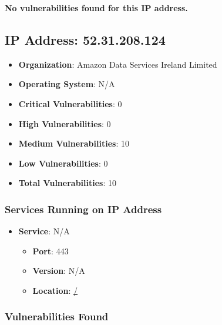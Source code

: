 \documentclass{article}
\begin{document}
\textbf{No vulnerabilities found for this IP address.}




\clearpage



\subsection*{IP Address: 52.31.208.124}

\begin{itemize}
    \item \textbf{Organization}: Amazon Data Services Ireland Limited
    \item \textbf{Operating System}:  N/A 
    \item \textbf{Critical Vulnerabilities}: 0
    \item \textbf{High Vulnerabilities}: 0
    \item \textbf{Medium Vulnerabilities}: 10
    \item \textbf{Low Vulnerabilities}: 0
    \item \textbf{Total Vulnerabilities}: 10
\end{itemize}

\subsubsection*{Services Running on IP Address}

\begin{itemize}
    
        \item \textbf{Service}: N/A
        \begin{itemize}
            \item \textbf{Port}: 443
            \item \textbf{Version}:  N/A 
            \item \textbf{Location}: \href{ / }{ / }
        \end{itemize}
    
\end{itemize}


\subsubsection*{Vulnerabilities Found}
\end{document}
